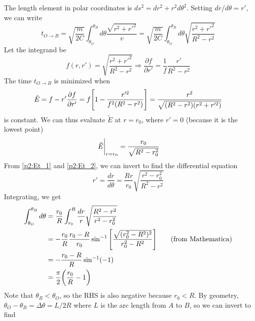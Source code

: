 \documentclass[12pt]{article}
\begin{document}
\begin{problem}{2}
\begin{solution}
\begin{equation}
    \end{equation}
    The length element in polar coordinates is $ds^2=dr^2+r^2d\theta^2$. Setting
    $dr/d\theta=r'$, we can write
    \begin{equation}\label{p2:tOB}
        t_{O\to B}
        =\sqrt{\frac{m}{2C}}\int_{\theta_O}^{\theta_B}d\theta
        \frac{\sqrt{r^2+r'^2}}{v}
        =\sqrt{\frac{m}{2C}}\int_{\theta_O}^{\theta_B}d\theta
            \sqrt{\frac{r^2+r'^2}{R^2-r^2}}
    \end{equation}
    Let the integrand be
    \begin{equation}
        f(r,r')=\sqrt{\frac{r^2+r'^2}{R^2-r^2}}
        \Rightarrow\frac{\partial f}{\partial r'}=\frac1f\frac{r'}{R^2-r^2}
    \end{equation}
    The time $t_{O\to B}$ is minimized when
    \begin{equation}\label{p2:Et_1}
        \tilde{E}=f-r'\frac{\partial f}{\partial r'}
        =f\qty[1-\frac{r'^2}{f^2(R^2-r^2)}]
        =\frac{r^2}{\sqrt{(R^2-r^2)(r^2+r'^2)}}
    \end{equation}
    is constant. We can thus evaluate $\tilde{E}$ at $r=r_0$, where $r'=0$
    (because it is the lowest point)
    \begin{equation}\label{p2:Et_2}
        \eval{\tilde{E}}_{r=r_0}=\frac{r_0}{\sqrt{R^2-r_0^2}}
    \end{equation}
    From \eqref{p2:Et_1} and \eqref{p2:Et_2}, we can invert to find the
    differential equation
    \begin{equation}\label{p2:rprime}
        r'=\frac{dr}{d\theta}=\frac{Rr}{r_0}\sqrt{\frac{r^2-r_0^2}{R^2-r^2}} 
    \end{equation}
    Integrating, we get
    \begin{align}
        \int_{\theta_O}^{\theta_B}d\theta
        &=\frac{r_0}{R}\int_{r_0}^R\frac{dr}{r}\sqrt{\frac{R^2-r^2}{r^2-r_0^2}}
            \notag\\
        &=-\frac{r_0}{R}\frac{r_0-R}{r_0}\sin^{-1}
        \qty[\frac{\sqrt{(r_0^2-R^2)^2}}{r_0^2-R^2}]\tag{from Mathematica}\\
        &=-\frac{r_0-R}{R}\sin^{-1}(-1)\notag\\
        &=\frac\pi2\qty(\frac{r_0}{R}-1)
    \end{align}
    Note that $\theta_B<\theta_O$, so the RHS is also negative because $r_0<R$.
    By geometry, $\theta_O-\theta_B=\Delta\theta=L/2R$ where $L$ is the
    arc length from $A$ to $B$, so we can invert to find
    \begin{equation}

\end{equation}
\end{solution}
\end{problem}
\end{document}
